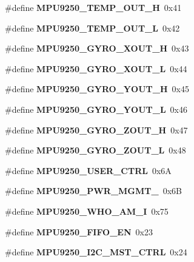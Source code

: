 \begin{DoxyCompactItemize}
\mbox{\label{_i_m_u__functions_8h_afa30ca80a7c6bb0a8249fa8d6dd95a0f}} 
\#define {\bfseries M\+P\+U9250\+\_\+\+T\+E\+M\+P\+\_\+\+O\+U\+T\+\_\+H}~0x41
\item 
\mbox{\label{_i_m_u__functions_8h_af95af2d67b983b2b3b814df7fe76233c}} 
\#define {\bfseries M\+P\+U9250\+\_\+\+T\+E\+M\+P\+\_\+\+O\+U\+T\+\_\+L}~0x42
\item 
\mbox{\label{_i_m_u__functions_8h_acaa2d67e1c58af7d682dc492acb8a911}} 
\#define {\bfseries M\+P\+U9250\+\_\+\+G\+Y\+R\+O\+\_\+\+X\+O\+U\+T\+\_\+H}~0x43
\item 
\mbox{\label{_i_m_u__functions_8h_acabd4ef05dfc9b0322a2b7353adadbb7}} 
\#define {\bfseries M\+P\+U9250\+\_\+\+G\+Y\+R\+O\+\_\+\+X\+O\+U\+T\+\_\+L}~0x44
\item 
\mbox{\label{_i_m_u__functions_8h_aacdf26a239b0cd31d9d7bc9ba812f94f}} 
\#define {\bfseries M\+P\+U9250\+\_\+\+G\+Y\+R\+O\+\_\+\+Y\+O\+U\+T\+\_\+H}~0x45
\item 
\mbox{\label{_i_m_u__functions_8h_a2fa6a36ab2a3e9a0887a66f00083313a}} 
\#define {\bfseries M\+P\+U9250\+\_\+\+G\+Y\+R\+O\+\_\+\+Y\+O\+U\+T\+\_\+L}~0x46
\item 
\mbox{\label{_i_m_u__functions_8h_a167d6cef38aada435a7926b3ed9faa58}} 
\#define {\bfseries M\+P\+U9250\+\_\+\+G\+Y\+R\+O\+\_\+\+Z\+O\+U\+T\+\_\+H}~0x47
\item 
\mbox{\label{_i_m_u__functions_8h_a49bf44f22ff73221ef1f12da1b418a4c}} 
\#define {\bfseries M\+P\+U9250\+\_\+\+G\+Y\+R\+O\+\_\+\+Z\+O\+U\+T\+\_\+L}~0x48
\item 
\mbox{\label{_i_m_u__functions_8h_ac99d5d7a6fe9478e88b905e871fc03fd}} 
\#define {\bfseries M\+P\+U9250\+\_\+\+U\+S\+E\+R\+\_\+\+C\+T\+RL}~0x6A
\item 
\mbox{\label{_i_m_u__functions_8h_a2a9d837bb715d6c7ba3c14a4fa5433a0}} 
\#define {\bfseries M\+P\+U9250\+\_\+\+P\+W\+R\+\_\+\+M\+G\+M\+T\+\_}~0x6B
\item 
\mbox{\label{_i_m_u__functions_8h_abbeb9762be6f9443df3c57561c8c3985}} 
\#define {\bfseries M\+P\+U9250\+\_\+\+W\+H\+O\+\_\+\+A\+M\+\_\+I}~0x75
\item 
\mbox{\label{_i_m_u__functions_8h_a9cb58e6b0474117ba9d0db2ae7c39641}} 
\#define {\bfseries M\+P\+U9250\+\_\+\+F\+I\+F\+O\+\_\+\+EN}~0x23
\item 
\mbox{\label{_i_m_u__functions_8h_aa384279b17d3d7d9ffea2c5ada427c5b}} 
\#define {\bfseries M\+P\+U9250\+\_\+\+I2\+C\+\_\+\+M\+S\+T\+\_\+\+C\+T\+RL}~0x24
\item 
\mbox{\label{_i_m_u__functions_8h_a23f87cacaa22c223b357f3bfc4feed28}} 

\end{DoxyCompactItemize}

